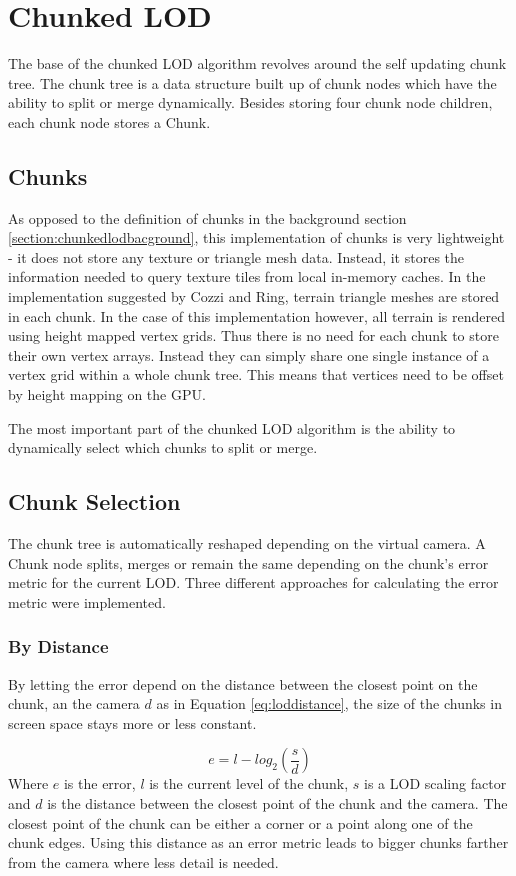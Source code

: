 \section{Chunked LOD}
The base of the chunked LOD algorithm revolves around the self updating chunk tree. The chunk tree is a data structure built up of chunk nodes which have the ability to split or merge dynamically. Besides storing four chunk node children, each chunk node stores a Chunk.

\subsection{Chunks}
As opposed to the definition of chunks in the background section \ref{section:chunkedlodbacground}, this implementation of chunks is very lightweight - it does not store any texture or triangle mesh data. Instead, it stores the information needed to query texture tiles from local in-memory caches. In the implementation suggested by Cozzi and Ring, terrain triangle meshes are stored in each chunk. In the case of this implementation however, all terrain is rendered using height mapped vertex grids. Thus there is no need for each chunk to store their own vertex arrays. Instead they can simply share one single instance of a vertex grid within a whole chunk tree. This means that vertices need to be offset by height mapping on the GPU.

The most important part of the chunked LOD algorithm is the ability to dynamically select which chunks to split or merge. 

\subsection{Chunk Selection}
The chunk tree is automatically reshaped depending on the virtual camera. A Chunk node splits, merges or remain the same depending on the chunk's error metric for the current LOD. Three different approaches for calculating the error metric were implemented.

\subsubsection{By Distance}
By letting the error depend on the distance between the closest point on the chunk, an the camera $d$ as in Equation \ref{eq:loddistance}, the size of the chunks in screen space stays more or less constant.

\begin{equation}
	\label{eq:loddistance}
	e = l - log_2(\frac{s}{d})
\end{equation}
Where $e$ is the error, $l$ is the current level of the chunk, $s$ is a LOD scaling factor and $d$ is the distance between the closest point of the chunk and the camera. The closest point of the chunk can be either a corner or a point along one of the chunk edges. Using this distance as an error metric leads to bigger chunks farther from the camera where less detail is needed.


